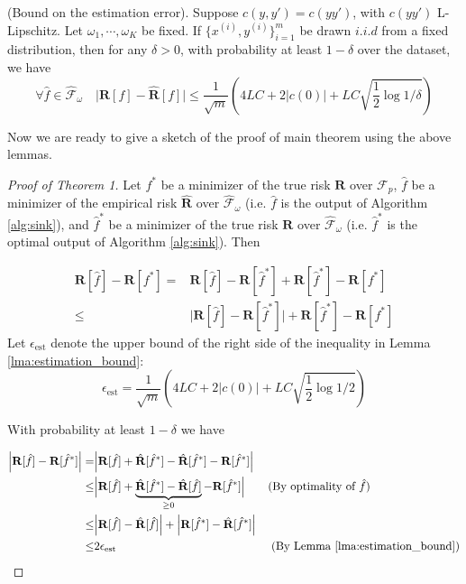 \documentclass{article}
\begin{document}
\begin{lemma}
    (Bound on the estimation error). Suppose $c(y, y') = c(yy')$, with $c(yy')$ L-Lipschitz. Let $\omega_1,\cdots, \omega_K$ be fixed.
    If $\{x^{(i)}, y^{(i)}\}_{i=1}^m$ be drawn $i.i.d$ from a fixed distribution, then for any $\delta > 0$, with probability at least $1 - \delta$ over the dataset, we have
    \[
    \forall \hat{f} \in \mathcal{\hat{F}}_\omega \quad
     \Big| \mathbf{R}[f]- \mathbf{\hat{R}}[f]\Big| \leq \frac{1}{\sqrt{m}} \left(4LC + 2|c(0)| + LC \sqrt{\frac{1}{2} \log 1/\delta}
\right)
     \]
     \label{lma:estimation_bound}
\end{lemma}
Now we are ready to give a sketch of the proof of main theorem using the above lemmas.\\
\begin{proof}[Proof of Theorem 1]
    Let $f^*$ be a minimizer of the true risk $\mathbf{R}$ over $\mathcal{F}_p$, $\hat{f}$ be a minimizer of the empirical risk $\hat{\mathbf{R}}$ over $\hat{\mathcal{F}}_\omega$ (i.e. $\hat{f}$ is the output of Algorithm \ref{alg:sink}), and $\hat{f}^*$ be a minimizer of the true risk $\mathbf{R}$ over $\hat{\mathcal{F}}_\omega$ (i.e. $\hat{f}^*$ is the optimal output of Algorithm \ref{alg:sink}). Then

    \begin{align}
        \mathbf{R}[\hat{f}]-\mathbf{R}[f^*]
        =& \mathbf{R}[\hat{f}]-\mathbf{R}[\hat{f}^*]+\mathbf{R}[\hat{f}^*]-\mathbf{R}[f^*] \\
        \leq& \Big|\mathbf{R}[\hat{f}]-\mathbf{R}[\hat{f}^*]\Big|+\mathbf{R}[\hat{f}^*]-\mathbf{R}[f^*]
    \end{align}
    Let $\epsilon_{\text{est}}$ denote the upper bound of the right side of the inequality in Lemma \ref{lma:estimation_bound}:
    \begin{equation*}
        \epsilon_{\text{est}}
        = \frac{1}{\sqrt{m}} \left(4LC + 2|c(0)| + LC \sqrt{\frac{1}{2} \log 1/2}\right)
    \end{equation*}

    With probability at least $1-\delta$ we have

    \begin{align*}
        \Big|\mathbf{R}[\hat{f}]-\mathbf{R}[\hat{f}^*]\Big|
           =&  \Big|\mathbf{R}[\hat{f}]+\hat{\mathbf{R}}[\hat{f}^*] -\hat{\mathbf{R}}[\hat{f}^*]-\mathbf{R}[\hat{f}^*]\Big|\\
        \leq& \Big|\mathbf{R}[\hat{f}]+\underbrace{\hat{\mathbf{R}}[\hat{f}^*] -\hat{\mathbf{R}}[\hat{f}]}_{\geq 0}-\mathbf{R}[\hat{f}^*]\Big|\quad\quad \text{(By optimality of $\hat{f}$)}\\
        \leq& \Big|\mathbf{R}[\hat{f}]-\hat{\mathbf{R}}[\hat{f}]\Big| +     \Big|\mathbf{R}[\hat{f}^*]-\hat{\mathbf{R}}[\hat{f}^*]\Big| \\
        \leq& 2\epsilon_{\text{est}} \hspace{135pt} \text{(By Lemma \ref{lma:estimation_bound})}
    \end{align*}


\end{proof}
\end{document}

